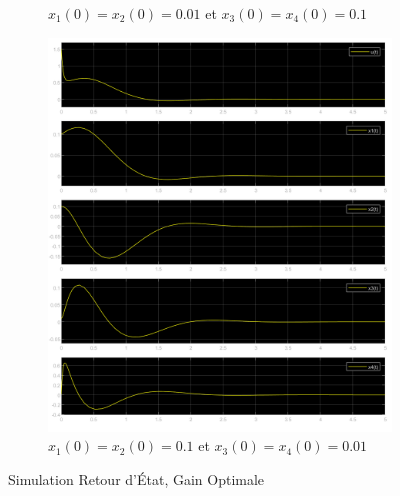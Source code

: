 \documentclass[class=article, crop=false]{standalone}
\begin{document}
\begin{resolution}
\begin{figure}[H]
\begin{subfigure}[b]{0.475\textwidth}
            \caption{$x_1(0) = x_2(0) = 0.01$ et $x_3(0) = x_4(0) = 0.1$}
        \end{subfigure}
        \begin{subfigure}[b]{0.475\textwidth}
            \centering
            \includegraphics[width=\textwidth]{../images/m3_r0_s0.1_o0_o.png}
            \caption{$x_1(0) = x_2(0) = 0.1$ et $x_3(0) = x_4(0) = 0.01$}
        \end{subfigure}
        \caption{Simulation Retour d'État, Gain Optimale}
    \end{figure}
\end{resolution}

\newpage
\end{document}
